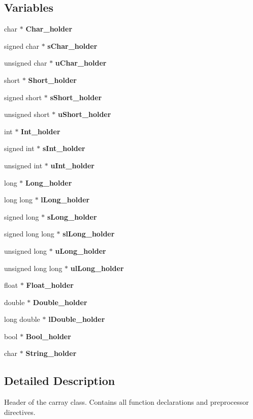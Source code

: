 \subsection*{Variables}
\begin{DoxyCompactItemize}
\item 
char $\ast$ {\bfseries Char\+\_\+holder}
\item 
signed char $\ast$ {\bfseries s\+Char\+\_\+holder}
\item 
unsigned char $\ast$ {\bfseries u\+Char\+\_\+holder}
\item 
short $\ast$ {\bfseries Short\+\_\+holder}
\item 
signed short $\ast$ {\bfseries s\+Short\+\_\+holder}
\item 
unsigned short $\ast$ {\bfseries u\+Short\+\_\+holder}
\item 
int $\ast$ {\bfseries Int\+\_\+holder}
\item 
signed int $\ast$ {\bfseries s\+Int\+\_\+holder}
\item 
unsigned int $\ast$ {\bfseries u\+Int\+\_\+holder}
\item 
long $\ast$ {\bfseries Long\+\_\+holder}
\item 
long long $\ast$ {\bfseries l\+Long\+\_\+holder}
\item 
signed long $\ast$ {\bfseries s\+Long\+\_\+holder}
\item 
signed long long $\ast$ {\bfseries sl\+Long\+\_\+holder}
\item 
unsigned long $\ast$ {\bfseries u\+Long\+\_\+holder}
\item 
unsigned long long $\ast$ {\bfseries ul\+Long\+\_\+holder}
\item 
float $\ast$ {\bfseries Float\+\_\+holder}
\item 
double $\ast$ {\bfseries Double\+\_\+holder}
\item 
long double $\ast$ {\bfseries l\+Double\+\_\+holder}
\item 
bool $\ast$ {\bfseries Bool\+\_\+holder}
\item 
char $\ast$ {\bfseries String\+\_\+holder}
\end{DoxyCompactItemize}


\subsection{Detailed Description}
Header of the carray class. Contains all function declarations and preprocessor directives. 

